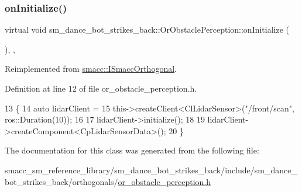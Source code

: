 \subsubsection{\texorpdfstring{on\+Initialize()}{onInitialize()}}
{\footnotesize\ttfamily virtual void sm\+\_\+dance\+\_\+bot\+\_\+strikes\+\_\+back\+::\+Or\+Obstacle\+Perception\+::on\+Initialize (\begin{DoxyParamCaption}{ }\end{DoxyParamCaption})\hspace{0.3cm}{\ttfamily [inline]}, {\ttfamily [override]}, {\ttfamily [virtual]}}



Reimplemented from \hyperlink{classsmacc_1_1ISmaccOrthogonal_a6bb31c620cb64dd7b8417f8705c79c7a}{smacc\+::\+I\+Smacc\+Orthogonal}.



Definition at line 12 of file or\+\_\+obstacle\+\_\+perception.\+h.


\begin{DoxyCode}
13     \{
14         \textcolor{keyword}{auto} lidarClient =
15             this->createClient<ClLidarSensor>(\textcolor{stringliteral}{"/front/scan"}, ros::Duration(10));
16 
17         lidarClient->initialize();
18 
19         lidarClient->createComponent<CpLidarSensorData>();
20     \}
\end{DoxyCode}


The documentation for this class was generated from the following file\+:\begin{DoxyCompactItemize}
\item 
smacc\+\_\+sm\+\_\+reference\+\_\+library/sm\+\_\+dance\+\_\+bot\+\_\+strikes\+\_\+back/include/sm\+\_\+dance\+\_\+bot\+\_\+strikes\+\_\+back/orthogonals/\hyperlink{strikes__back_2include_2sm__dance__bot__strikes__back_2orthogonals_2or__obstacle__perception_8h}{or\+\_\+obstacle\+\_\+perception.\+h}\end{DoxyCompactItemize}

